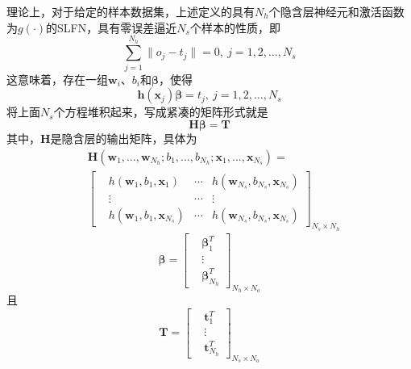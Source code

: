 理论上，对于给定的样本数据集，上述定义的具有$N_{h}$个隐含层神经元和激活函数为$g(\cdot)$的SLFN，具有零误差逼近$N_{s}$个样本的性质，即
\begin{equation*}
\sum_{j=1}^{N_{h}}\|o_{j}-t_{j}\|=0,\ j=1,2,\dots,N_{s}
\end{equation*}
这意味着，存在一组$\bm{w}_{i}$、$b_{i}$和$\bm{\beta}$，使得
\begin{equation}
\bm{h}(\bm{x}_{j})\bm{\beta}=t_{j},\ j=1,2,\dots,N_{s}
\end{equation}
将上面$N_{s}$个方程堆积起来，写成紧凑的矩阵形式就是
\begin{equation}\label{eq:4.nn.HT}
\bm{H}\bm{\beta}=\bm{T}
\end{equation}
其中，$\bm{H}$是隐含层的输出矩阵，具体为
\begin{equation}\label{eq:4.nn.H}
\begin{split}
&\bm{H}(\bm{w}_{1},\dots,\bm{w}_{N_{h}};b_{1},\dots,b_{N_{h}};\bm{x}_{1},\dots,\bm{x}_{N_{s}})=\\
&\begin{bmatrix}
&h(\bm{w}_{1},b_{1},\bm{x}_{1}) &\cdots &h(\bm{w}_{N_{s}},b_{N_{s}},\bm{x}_{N_{s}})\\
&\vdots &\cdots & \vdots\\
&h(\bm{w}_{1},b_{1},\bm{x}_{N_{s}}) &\cdots &h(\bm{w}_{N_{s}},b_{N_{s}},\bm{x}_{N_{s}})
\end{bmatrix}_{N_{s}\times N_{h}}
\end{split}
\end{equation}
\begin{equation}\label{eq:4.nn.beta}
\bm{\beta} = \begin{bmatrix}%
&\bm{\beta}_{1}^{T}\\
&\vdots\\
&\bm{\beta}_{N_{h}}^{T}
\end{bmatrix}_{N_{h}\times N_{o}}
\end{equation}
且
\begin{equation}\label{eq:4.nn.T}
\bm{T} = \begin{bmatrix}%
&\bm{t}_{1}^{T}\\
&\vdots\\
&\bm{t}_{N_{h}}^{T}
\end{bmatrix}_{N_{s}\times N_{o}}
\end{equation}

